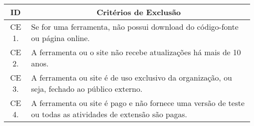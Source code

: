 \begin{table}[!htb]
  \centering
  \footnotesize
  \begin{tabular}{c|p{8cm}}
    \bottomrule
    \rowcolor[rgb]{0.753,0.753,0.753} \textbf{ID} & \multicolumn{1}{c}{\textbf{Critérios de Exclusão}}                                                          \\
    \hline
    \rowcolor[rgb]{0.898,0.898,0.898} CE 1.       & Se for uma ferramenta, não possui download do código-fonte ou página online.                                \\
    CE 2.                                         & A ferramenta ou o site não recebe atualizações há mais de 10 anos.                                          \\
    \rowcolor[rgb]{0.898,0.898,0.898} CE 3.       & A ferramenta ou site é de uso exclusivo da organização, ou seja, fechado ao público externo.                \\
    CE 4.                                         & A ferramenta ou site é pago e não fornece uma versão de teste ou todas as atividades de extensão são pagas. \\
    \toprule
  \end{tabular}
\end{table}